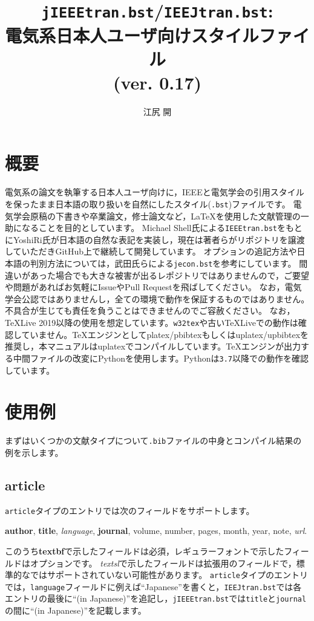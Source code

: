 \documentclass[10pt, a4paper, dvipdfmx, uplatex]{jsarticle} %
\title{\texttt{jIEEEtran.bst}/\texttt{IEEJtran.bst}:\\電気系日本人ユーザ向け\BibTeX スタイルファイル\\(ver. 0.17)}
\author{江尻 開}
\begin{document}
\maketitle
\tableofcontents



\section{概要}
\begin{bibunit}[jIEEEtran]

電気系の論文を執筆する日本人ユーザ向けに，IEEEと電気学会の引用スタイルを保ったまま日本語の取り扱いを自然にした\BibTeX スタイル(\texttt{.bst})ファイルです。
電気学会原稿の下書きや卒業論文，修士論文など，\LaTeX を使用した文献管理の一助になることを目的としています。
Michael Shell氏による\texttt{IEEEtran.bst}\cite{IEEEtran}をもとにYoshiRi氏が日本語の自然な表記を実装し，現在は著者らがリポジトリを譲渡していただきGitHub上\cite{jIEEEtran}で継続して開発しています。
オプションの追記方法や日本語の判別方法については，武田氏らによる\texttt{jecon.bst}\cite{jeconbst}を参考にしています。
間違いがあった場合でも大きな被害が出るレポジトリではありませんので，ご要望や問題があればお気軽にIssueやPull Requestを飛ばしてください。
なお，電気学会公認ではありませんし，全ての環境で動作を保証するものではありません。不具合が生じても責任を負うことはできませんのでご容赦ください。
なお，\TeX Live 2019以降の使用を想定しています。\texttt{w32tex}や古い\TeX Liveでの動作は確認していません。\TeX エンジンとしてplatex/pbibtexもしくはuplatex/upbibtexを推奨し，本マニュアルはuplatexでコンパイルしています。\TeX エンジンが出力する中間ファイルの改変にPythonを使用します。Pythonは\texttt{3.7}以降での動作を確認しています。

{\small \putbib[./ref]}
\end{bibunit}


\section{使用例}
まずはいくつかの文献タイプについて\texttt{.bib}ファイルの中身とコンパイル結果の例を示します。

\subsection{article}

\texttt{article}タイプのエントリでは次のフィールドをサポートします。
\begin{center}
\textbf{author}, \textbf{title}, \textsl{language}, \textbf{journal}, volume, number, pages, month, year, note, \textsl{url}.
\end{center}
このうち\textbf{textbf}で示したフィールドは必須，レギュラーフォントで示したフィールドはオプションです。
\textsl{textsl}で示したフィールドは拡張用のフィールドで，標準的な\BibTeX ではサポートされていない可能性があります。
\texttt{article}タイプのエントリでは，\texttt{language}フィールドに例えば``Japanese''を書くと，\texttt{IEEJtran.bst}では各エントリの最後に``(in Japanese)''を追記し，\texttt{jIEEEtran.bst}では\texttt{title}と\texttt{journal}の間に``(in Japanese)''を記載します。
\end{document}
